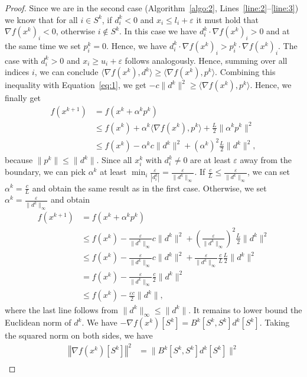 \documentclass[letterpaper]{article} %
\newcommand{\vareps}{\varepsilon}
\newcommand{\sprod}[2]{\langle{#1}, {#2}\rangle}
\newcommand{\norm}[1]{\left\Vert#1\right\Vert}
\begin{document}
\begin{proof}
Since we are in the second case (Algorithm~\ref{algo:2}, Lines~\ref{line:2}--\ref{line:3}) we know that for all $i\in S^k$, if $d^k_i < 0$ and $x_i\leq l_i +\vareps$ it must hold that $\nabla f(x^k)_i < 0$,  otherwise $i\notin S^k$. In this case we have $d^k_i \cdot \nabla f(x^k)_i > 0$ and at the same time we set $p^k_i=0$. Hence, we have $d^k_i \cdot \nabla f(x^k)_i > p^k_i \cdot \nabla f(x^k)_i$. The case with $d^k_i > 0$ and $x_i\geq u_i +\vareps$ follows analogously. Hence, summing over all indices $i$, we can conclude $\sprod{\nabla f(x^k)}{d^k}\geq \sprod{\nabla f(x^k)}{p^k}$. Combining this inequality with Equation~\eqref{eq:1}, we get $-c\|d^k\|^2\geq\sprod{\nabla f(x^k)}{p^k}$.
Hence, we finally get
\begin{align*}
f(x^{k+1}) & = f(x^k+\alpha^kp^k) \\
& \leq f(x^k) + \alpha^k\sprod{\nabla f(x^k)}{p^k} + \frac{L}{2}\|\alpha^k p^k\|^2  \\
& \leq f(x^k) - \alpha^k c\|d^k\|^2 + (\alpha^k)^2 \frac{L}{2}\|d^k\|^2,
\end{align*}
because $\|p^k\| \leq \|d^k\|$.
Since all $x^k_i$ with $d^k_i\neq 0$ are at least $\vareps$ away from the boundary, we can pick $\alpha^k$ at least $\min_i \frac{\vareps}{|d^k_i|}=\frac{\vareps}{\|d^k\|_\infty}$.
If $\frac{c}{L}\leq \frac{\vareps}{\|d^k\|_\infty}$, we can set $\alpha^k=\frac{c}{L}$ and obtain the same result as in the first case. Otherwise, we set $\alpha^k=\frac{\vareps}{\|d^k\|_\infty}$ and obtain
\[
\begin{split}
f(x^{k+1}) & = f(x^k+\alpha^kp^k) \\ %
&\leq f(x^k) - \frac{\vareps}{\|d^k\|_\infty} c\|d^k\|^2 + \left(\frac{\vareps}{\|d^k\|_\infty}\right)^2\frac{L}{2}\|d^k\|^2 \\
& \leq f(x^k) - \frac{\vareps}{\|d^k\|_\infty} c\|d^k\|^2 + \frac{\vareps}{\|d^k\|_\infty}\frac{c}{L}\frac{L}{2}\|d^k\|^2 \\
&= f(x^k) - \frac{\vareps}{\|d^k\|_\infty}\frac{c}{2}\|d^k\|^2 \\
& \leq f(x^k) - \frac{\vareps c}{2}\|d^k\|,
\end{split}
\]
where the last line follows from $\|d^k\|_\infty \leq \|d^k\|$.
It remains to lower bound the Euclidean norm of $d^k$.
We have $-\nabla f(x^k)[S^k]=B^k[S^k, S^k] d^k[S^k]$. Taking the squared norm on both sides, we have
\[
\begin{split}
\norm{\nabla f(x^k)[S^k]}^2  & = \|B^k[S^k, S^k] d^k[S^k]\|^2 \\

\end{split}\]
\end{proof}
\end{document}
